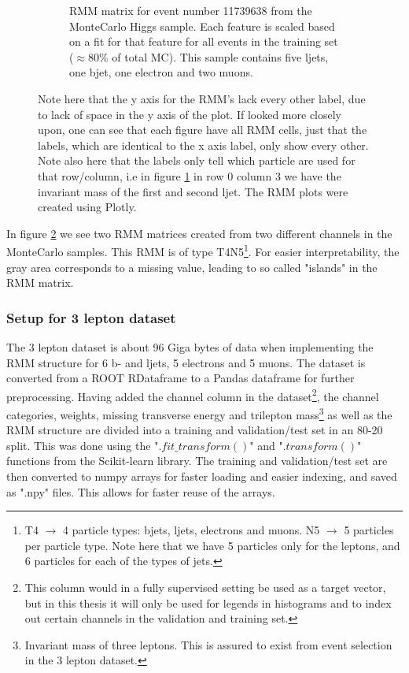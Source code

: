 \begin{figure}
\begin{subfigure}{.8\textwidth}
        \caption{ RMM matrix for event number 11739638 from the MonteCarlo Higgs sample. Each feature is scaled based on a fit for that feature for 
        all events in the training set ($\approx 80\%$ of total MC). This sample contains five ljets, one bjet, one electron and two muons. }
        \label{fig:rmm_higgs_event}
    \end{subfigure}
    \hfill        
    \caption[Single event RMM plot]{Note here that the y axis for the RMM's lack every other label, due to lack of space in the y axis of the plot. If looked more closely upon, one can see that 
    each figure have all RMM cells, just that the labels, which are identical to the x axis label, only show every other. Note also here that the labels only tell which particle are used for that row/column, i.e 
    in figure \ref{fig:rmm_higgs_event} in row 0 column 3 we have the invariant mass of the first and second ljet. The RMM plots were created using 
    Plotly\cite{plotly}. }
    \label{fig:rmm_singular_events}
\end{figure}

In figure \ref{fig:rmm_singular_events} we see two RMM matrices created from two different channels in the MonteCarlo samples. 
This RMM is of type T4N5\footnote{T4 $\to$ 4 particle types: bjets, ljets, electrons and muons. N5 $\to$ 5 particles per 
particle type. Note here that we have 5 particles only for the leptons, and 6 particles for each of the types of jets.}. 
 For easier interpretability, the gray area corresponds to a missing value, leading to so called "islands" in the RMM matrix.



\subsubsection*{Setup for 3 lepton dataset}
The 3 lepton dataset is about 96 Giga bytes of data when implementing the RMM structure for 6 b- and ljets, 5 electrons and 5 muons. The dataset 
is converted from a ROOT RDataframe to a Pandas dataframe\cite{reback2020pandas} for further preprocessing. Having added the channel column in 
the dataset\footnote{This column would in a fully supervised setting be used as a target vector, but in this thesis it will only be used for legends in
histograms and to index out certain channels in the validation and training set. }, the channel categories, weights, missing transverse energy and 
trilepton mass\footnote{Invariant mass of three leptons. This is assured to exist from event selection in the 3 lepton dataset.} as well as the RMM structure are divided into 
a training and validation/test set in an 80-20 split. This was done using the "$.fit\_transform()$" and "$.transform()$" functions from the 
Scikit-learn library\cite{scikit-learn}. The training and validation/test set are then converted to numpy arrays\cite{harris2020array} for faster 
loading and easier indexing, and saved as ".npy" files. This allows for faster reuse of the arrays. 


